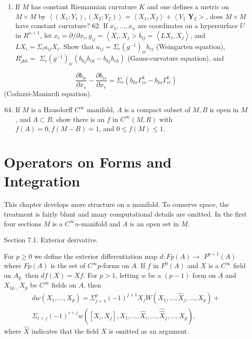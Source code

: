 \documentclass[10pt]{article}
\begin{document}
\begin{enumerate}
  \item If $M$ has constant Riemannian curvature $K$ and one defines a metric on $M \times M$ by $\left\langle\left(X_{1} ; Y_{1}\right),\left(X_{2} ; Y_{2}\right)\right\rangle=\left\langle X_{1}, X_{2}\right\rangle+\left\langle V_{1}\right.$ $\boldsymbol{Y}_{2}>$, does $M \times M$ have constant curvature? 62. If $x_{1}, \ldots, x_{n}$ are coordinates on a hypersurface $U$ in $R^{n+1}$, let $x_{i}=\partial / \partial x_{i}, g_{i j}=\left\langle X_{i}, X_{j}>b_{i j}=\left\langle L X_{i}, X_{j}\right\rangle\right.$, and $L X_{i}=\Sigma_{i} a_{i j} X_{i}$. Show that $a_{i j}=\Sigma_{r}\left(g^{-1}\right)_{i r} b_{r j}$ (Weingarten equation), $R_{j k h}^{i}=$ $\Sigma_{r}\left(g^{-1}\right)_{i r}\left(b_{h j} b_{r k}-b_{k j} b_{r h}\right)$ (Gauss-curvature equation), and

\end{enumerate}
$$
\frac{\partial b_{i r}}{\partial x_{s}}-\frac{\partial b_{i s}}{\partial x_{r}}=\Sigma_{r}\left(b_{k r} \Gamma_{i s}^{k}-b_{k s} \Gamma_{i r}^{k}\right)
$$
(Codazzi-Maniardi equation).

\begin{enumerate}
  \setcounter{enumi}{63}
  \item If $M$ is a Hausdorff $C^{\infty}$ manifold, $A$ is a compact subset of $M, B$ is open in $M$, and $A \subset B$, show there is an $f$ in $C^{\infty}(M, R)$ with $f(A)=0, f(M-B)=1$, and $0 \leq f(M) \leq 1$.
\end{enumerate}
\section{Operators on Forms and Integration}
This chapter develops more structure on a manifold. To conserve space, the treatment is fairly blunt and many computational details are omitted. In the first four sections $M$ is a $C^{\infty} n$-manifold and $A$ is an open set in $M$.

Section 7.1. Exterior derivative.

For $p \geq 0$ we define the exterior differentiation map $d: F p(A) \rightarrow$ $F^{p+1}(A)$ where $F p(A)$ is the set of $C^{\infty} p$-forms on $A$. If $f$ in $F^{0}(A)$ and $X$ is a $C^{\infty}$ field on $A_{\text {p }}$ then $d f(X)=X f$. For $p>1$, letting $w$ be a $(p-1)$ form on $A$ and $X_{1 p . .,} X_{p}$ be $C^{\infty}$ fields on $A$, then
$$
\begin{gathered}
d w\left(X_{1}, \ldots, X_{p}\right)=\Sigma_{j=1}^{p}(-1)^{j+1} X_{j} W\left(X_{1}, \ldots, \hat{X}_{j}, \ldots, X_{p}\right)+ \\
\Sigma_{i<j}(-1)^{i+j} w\left(\left[X_{i}, X_{j}\right], X_{1}, \ldots, \hat{X}_{i}, \ldots, \hat{\hat{X}}_{j}, \ldots, X_{p}\right),
\end{gathered}
$$
where $\hat{X}$ indicates that the field $X$ is omitted as an argument.
\end{document}
